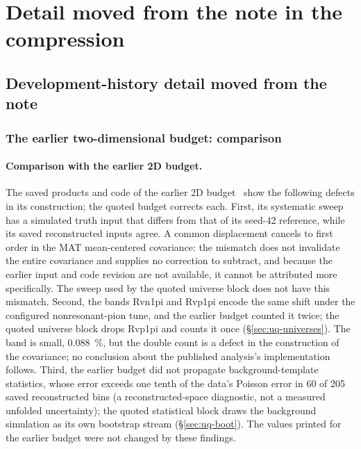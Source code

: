 \section{Detail moved from the note in the compression}
\label{app:compression-records}

\subsection{Development-history detail moved from the note}

\subsubsection{The earlier two-dimensional budget: comparison}
\paragraph{Comparison with the earlier 2D budget.} The saved products and code of the earlier 2D budget~\cite{TwoDFollowup2026} show the following defects in its construction; the quoted budget corrects each. First, its systematic sweep has a simulated truth input that differs from that of its seed-42 reference, while its saved reconstructed inputs agree. A common displacement cancels to first order in the MAT mean-centered covariance: the mismatch does not invalidate the entire covariance and supplies no correction to subtract, and because the earlier input and code revision are not available, it cannot be attributed more specifically. The sweep used by the quoted universe block does not have this mismatch.
Second, the bands Rvn1pi and Rvp1pi encode the same shift under the configured nonresonant-pion tune, and the earlier budget counted it twice; the quoted universe block drops Rvp1pi and counts it once (\S\ref{sec:uq-universes}). The band is small, \SI{0.088}{\percent}, but the double count is a defect in the construction of the covariance; no conclusion about the published analysis's implementation follows.
%
Third, the earlier budget did not propagate background-template statistics, whose error exceeds one tenth of the data's Poisson error in 60 of 205 saved reconstructed bins (a reconstructed-space diagnostic, not a measured unfolded uncertainty); the quoted statistical block draws the background simulation as its own bootstrap stream (\S\ref{sec:uq-boot}). The values printed for the earlier budget were not changed by these findings.

